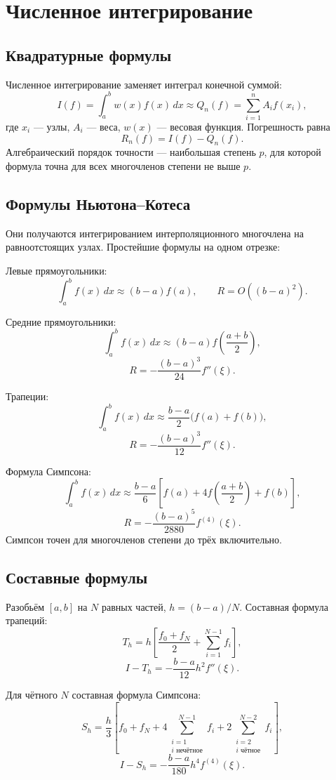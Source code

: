\section{Численное интегрирование}
\label{sec:numerical-integration}

\subsection{Квадратурные формулы}

Численное интегрирование заменяет интеграл конечной суммой:
\[
    I(f)=\int_a^b w(x)f(x)\,dx
    \approx
    Q_n(f)=\sum_{i=1}^{n}A_i f(x_i),
\]
где $x_i$ --- узлы, $A_i$ --- веса, $w(x)$ --- весовая функция.
Погрешность равна
\[
    R_n(f)=I(f)-Q_n(f).
\]
Алгебраический порядок точности --- наибольшая степень $p$, для которой формула
точна для всех многочленов степени не выше $p$.

\subsection{Формулы Ньютона--Котеса}

Они получаются интегрированием интерполяционного многочлена на равноотстоящих
узлах. Простейшие формулы на одном отрезке:

Левые прямоугольники:
\[
    \int_a^b f(x)\,dx
    \approx (b-a)f(a),
    \qquad R=O((b-a)^2).
\]

Средние прямоугольники:
\[
    \int_a^b f(x)\,dx
    \approx (b-a)f\left(\frac{a+b}{2}\right),
\]
\[
    R=-\frac{(b-a)^3}{24}f''(\xi).
\]

Трапеции:
\[
    \int_a^b f(x)\,dx
    \approx \frac{b-a}{2}\bigl(f(a)+f(b)\bigr),
\]
\[
    R=-\frac{(b-a)^3}{12}f''(\xi).
\]

Формула Симпсона:
\[
    \int_a^b f(x)\,dx
    \approx
    \frac{b-a}{6}
    \left[f(a)+4f\left(\frac{a+b}{2}\right)+f(b)\right],
\]
\[
    R=-\frac{(b-a)^5}{2880}f^{(4)}(\xi).
\]
Симпсон точен для многочленов степени до трёх включительно.

\subsection{Составные формулы}

Разобьём $[a,b]$ на $N$ равных частей, $h=(b-a)/N$.
Составная формула трапеций:
\[
    T_h=h\left[
    \frac{f_0+f_N}{2}+\sum_{i=1}^{N-1}f_i
    \right],
\]
\[
    I-T_h=-\frac{b-a}{12}h^2f''(\xi).
\]

Для чётного $N$ составная формула Симпсона:
\[
S_h=\frac{h}{3}
\left[
 f_0+f_N
 +4\sum_{\substack{i=1\\i\text{ нечётное}}}^{N-1}f_i
 +2\sum_{\substack{i=2\\i\text{ чётное}}}^{N-2}f_i
\right],
\]
\[
    I-S_h=-\frac{b-a}{180}h^4f^{(4)}(\xi).
\]


